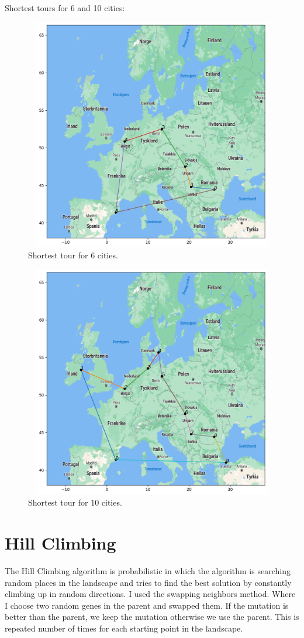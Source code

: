 \documentclass[a4paper,12pt]{article}
\begin{document}
Shortest tours for 6 and 10 cities:
\begin{figure}[H]
\centerline{\includegraphics[width=6in, height=4in]{ExhaustiveSearchMap1.png}}
\caption{Shortest tour for 6 cities.}
\label{fig}
\end{figure}

\begin{figure}[H]
\centerline{\includegraphics[width=6in, height=4in]{ExhaustiveSearchMap2.png}}
\caption{Shortest tour for 10 cities.}
\label{fig}
\end{figure}

\section{Hill Climbing }
The Hill Climbing algorithm is probabilistic in which the algorithm is searching random places in the landscape and tries to find the best solution by constantly climbing up in random directions. I used the swapping neighbors method. Where I choose two random genes in the parent and swapped them. If the mutation is better than the parent, we keep the mutation otherwise we use the parent. This is repeated number of times for each starting point in the landscape.  \\
\end{document}
